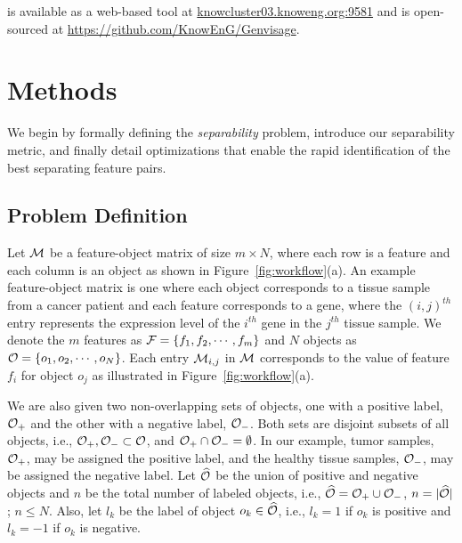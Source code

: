 \genviz is available as a web-based tool at \url{knowcluster03.knoweng.org:9581}
 and is open-sourced at \url{https://github.com/KnowEnG/Genvisage}.


\section{Methods}
\label{sec:method}
We begin by formally defining the {\em separability} problem,
introduce our separability metric,
and finally detail optimizations that enable
the rapid identification of the best separating feature pairs.

\subsection{Problem Definition}\label{sec:prob}

Let ${\mathcal{M}}$ be a feature-object matrix of size $m\times N$, 
where each row is a feature and each column is an 
object as shown in Figure~\ref{fig:workflow}(a). 
An example feature-object matrix is one where 
each object corresponds to a tissue sample 
from a cancer patient and each feature corresponds to a gene, 
where the $(i,j)^{th}$ entry represents the 
expression level of the $i^{th}$ gene in the $j^{th}$ 
tissue sample. 
We denote the $m$ features as ${\mathcal{F}}=\{f_1,f_2,\cdots,f_m\}$ 
and $N$ objects as ${\mathcal{O}}=\{o_1,o_2,\cdots,o_N\}$. 
Each entry ${\mathcal{M}}_{i,j}$ in ${\mathcal{M}}$ corresponds
to the value of feature $f_i$ for object $o_j$ as illustrated in Figure~\ref{fig:workflow}(a).

We are also given two non-overlapping sets of objects, 
one with a positive label, ${\mathcal{O}}_+$ and the other with a negative label, ${\mathcal{O}}_-$. 
Both sets are disjoint subsets of all objects, 
i.e., ${\mathcal{O}}_+, {\mathcal{O}}_-\subset {\mathcal{O}}$, and ${\mathcal{O}}_+\cap {\mathcal{O}}_- = \emptyset$. 
In our example, tumor samples, ${\mathcal{O}}_+$, 
may be assigned the positive label, 
and the healthy tissue samples, ${\mathcal{O}}_-$, 
may be assigned the negative label. 
Let $\widehat{{\mathcal{O}}}$ be the union of positive and negative objects and $n$ be the total number of labeled objects, i.e., $\widehat{{\mathcal{O}}}={\mathcal{O}}_+\cup {\mathcal{O}}_-$, $n=|\widehat{{\mathcal{O}}}|$; $n\leq N$. Also, let $l_k$ be the label of object $o_k\in \widehat{{\mathcal{O}}}$, i.e., $l_k=1$ if $o_k$ is positive and $l_k=-1$ if $o_k$ is negative.

